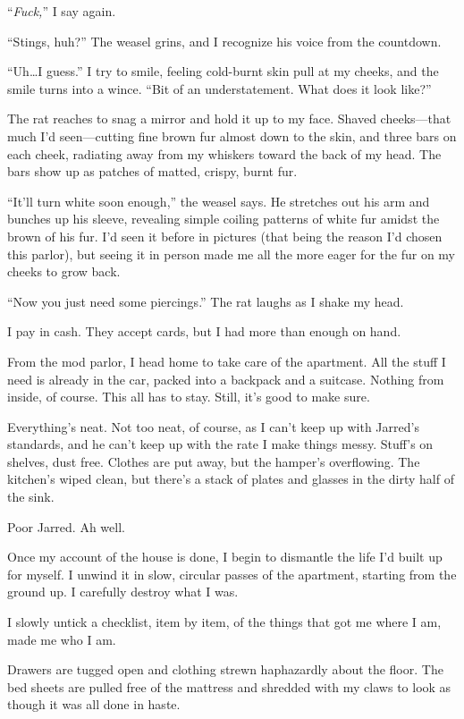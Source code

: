 ``\emph{Fuck,}'' I say again.

``Stings, huh?'' The weasel grins, and I recognize his voice from the countdown.

``Uh\ldots{}I guess.'' I try to smile, feeling cold-burnt skin pull at my cheeks, and the smile turns into a wince. ``Bit of an understatement. What does it look like?''

The rat reaches to snag a mirror and hold it up to my face. Shaved cheeks---that much I'd seen---cutting fine brown fur almost down to the skin, and three bars on each cheek, radiating away from my whiskers toward the back of my head. The bars show up as patches of matted, crispy, burnt fur.

``It'll turn white soon enough,'' the weasel says. He stretches out his arm and bunches up his sleeve, revealing simple coiling patterns of white fur amidst the brown of his fur. I'd seen it before in pictures (that being the reason I'd chosen this parlor), but seeing it in person made me all the more eager for the fur on my cheeks to grow back.

``Now you just need some piercings.'' The rat laughs as I shake my head.

I pay in cash. They accept cards, but I had more than enough on hand.

\secdiv{}

\noindent From the mod parlor, I head home to take care of the apartment. All the stuff I need is already in the car, packed into a backpack and a suitcase. Nothing from inside, of course. This all has to stay. Still, it's good to make sure.

Everything's neat. Not too neat, of course, as I can't keep up with Jarred's standards, and he can't keep up with the rate I make things messy. Stuff's on shelves, dust free. Clothes are put away, but the hamper's overflowing. The kitchen's wiped clean, but there's a stack of plates and glasses in the dirty half of the sink.

Poor Jarred. Ah well.

Once my account of the house is done, I begin to dismantle the life I'd built up for myself. I unwind it in slow, circular passes of the apartment, starting from the ground up. I carefully destroy what I was.

I slowly untick a checklist, item by item, of the things that got me where I am, made me who I am.

Drawers are tugged open and clothing strewn haphazardly about the floor. The bed sheets are pulled free of the mattress and shredded with my claws to look as though it was all done in haste.

